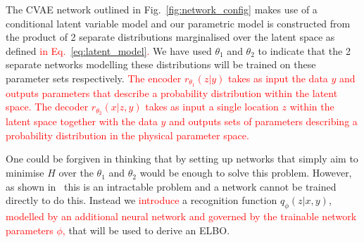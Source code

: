 \documentclass[%
showpacs,
nofootinbib,
 amsmath,amssymb,
 aps,
 twocolumn,
 prl,
 reprint,
floatfix,
]{revtex4-1}
\newcommand{\new}[1]{\textcolor{red}{#1}}
\begin{document}
%
%
The \ac{CVAE} network outlined in Fig.~\ref{fig:network_config} makes use of a
conditional latent variable model and our parametric model is constructed from
the product of 2 separate distributions marginalised over the latent space as
defined \new{in Eq.~\ref{eq:latent_model}.} We have used $\theta_{1}$ and
$\theta_{2}$ to indicate that the 2 separate networks modelling these
distributions will be trained on these parameter sets respectively. \new{The
encoder $r_{\theta_1}(z|y)$ takes as input the data $y$ and outputs parameters
that describe a probability distribution within the latent space. The decoder
$r_{\theta_2}(x|z,y)$ takes as input a single location $z$ within the latent
space together with the data $y$ and outputs sets of parameters describing a
probability distribution in the physical parameter space.} 

%
%
One could be forgiven in thinking that by setting up networks that simply aim
to minimise $H$ over the $\theta_{1}$ and $\theta_{2}$ would be enough to solve
this problem. However, as shown in~\cite{NIPS2015_5775} this is an intractable
problem and a network cannot be trained directly to do this. Instead we
\new{introduce} a recognition function $q_{\phi}(z|x,y)$, \new{modelled by an
additional neural network and governed by the trainable network parameters
$\phi$,} that will be used to derive an \ac{ELBO}.
\end{document}
